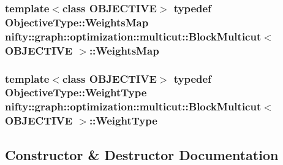 \subsubsection[{Weights\+Map}]{\setlength{\rightskip}{0pt plus 5cm}template$<$class O\+B\+J\+E\+C\+T\+I\+V\+E$>$ typedef Objective\+Type\+::\+Weights\+Map {\bf nifty\+::graph\+::optimization\+::multicut\+::\+Block\+Multicut}$<$ O\+B\+J\+E\+C\+T\+I\+V\+E $>$\+::{\bf Weights\+Map}}\label{classnifty_1_1graph_1_1optimization_1_1multicut_1_1BlockMulticut_aede83b2ab0b90027a3bc8534f1e3df9f}
\hypertarget{classnifty_1_1graph_1_1optimization_1_1multicut_1_1BlockMulticut_aa5bbe72e3c448275a0a0f8f9bbc48f49}{}
\subsubsection[{Weight\+Type}]{\setlength{\rightskip}{0pt plus 5cm}template$<$class O\+B\+J\+E\+C\+T\+I\+V\+E$>$ typedef Objective\+Type\+::\+Weight\+Type {\bf nifty\+::graph\+::optimization\+::multicut\+::\+Block\+Multicut}$<$ O\+B\+J\+E\+C\+T\+I\+V\+E $>$\+::{\bf Weight\+Type}}\label{classnifty_1_1graph_1_1optimization_1_1multicut_1_1BlockMulticut_aa5bbe72e3c448275a0a0f8f9bbc48f49}


\subsection{Constructor \& Destructor Documentation}
\hypertarget{classnifty_1_1graph_1_1optimization_1_1multicut_1_1BlockMulticut_a79b2fe4e7494b9d433b6f738814f3c81}{}

